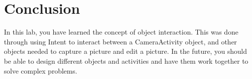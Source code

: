 \section{Conclusion}

In this lab, you have learned the concept of object interaction. This was done through using Intent to interact between a CameraActivity object, and other objects needed to capture a picture and edit a picture. In the future, you should be able to design different objects and activities and have them work together to solve complex problems.